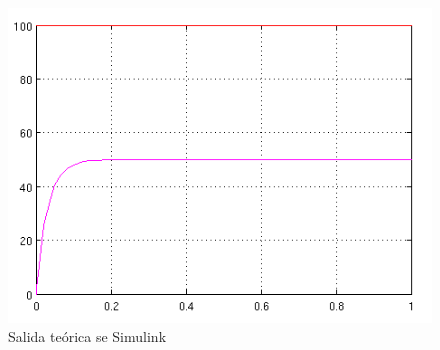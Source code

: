 \documentclass[twocolumn]{IEEEtran}
\begin{document}
\begin{figure}[H]
	\centering
		\includegraphics[scale=0.8]{salida1.png}
	\caption{Salida teórica se Simulink}
	\label{fig2}
\end{figure}
\end{document}

